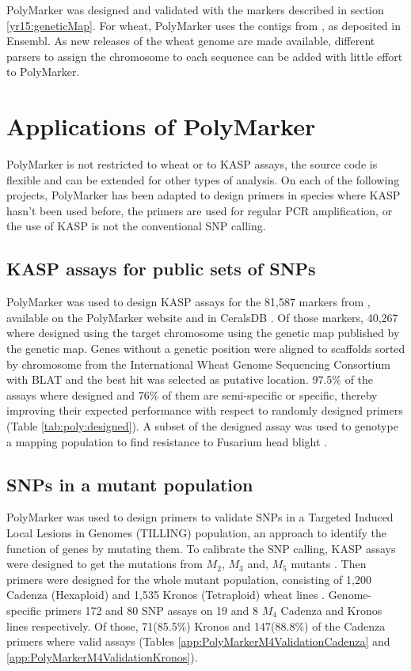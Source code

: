 PolyMarker was designed and validated with the markers described in section \ref{yr15:geneticMap}. 
For wheat, PolyMarker uses the contigs from \cite{Mayer2014}, as deposited in Ensembl. 
As new releases of the wheat genome are made available, different parsers to assign the chromosome to each sequence can be added with little effort to PolyMarker. 




\section{Applications of PolyMarker}

PolyMarker is not restricted to wheat or to KASP assays, the source code is flexible and can be extended for other types of analysis. 
On each of the following projects, PolyMarker has been adapted to design primers in species where KASP hasn't been used before, the primers are used for regular PCR amplification, or the use of KASP is not the conventional SNP calling. 

\subsection{KASP assays for public sets of SNPs} 

PolyMarker was used to design KASP assays for the 81,587 markers from \citep{Wang2014}, available on the PolyMarker website and in CeralsDB \citep{Wilkinson2012}. 
Of those markers, 40,267 where designed using the target chromosome using the genetic map published by the genetic map. 
Genes without a genetic position were aligned to scaffolds sorted by chromosome from the International Wheat Genome Sequencing Consortium \citep{Mayer2014} with BLAT \citep{Kent2002} and the best hit was selected as putative location. 
97.5\% of the assays where designed and 76\% of them are semi-specific or specific, thereby improving their expected performance with respect to randomly designed primers (Table \ref{tab:poly:designed}). 
A subset of the designed assay was used to genotype a mapping population to find resistance to Fusarium head blight \citep{Burt2015}. 

\subsection{SNPs in a mutant population}

PolyMarker was used to design primers to validate SNPs in a Targeted Induced Local Lesions in Genomes (TILLING) population, an approach to identify the function of genes by mutating them. 
To calibrate the SNP calling, KASP assays were designed to get the mutations from $M_{2}$, $M_{3}$ and, $M_{5}$ mutants \citep{King2015}. 
Then primers were designed for the whole mutant population, consisting of 1,200 Cadenza (Hexaploid) and 1,535 Kronos (Tetraploid) wheat lines \citep{Krasileva2016}. Genome-specific primers  172 and 80 SNP assays on 19 and 8 $M_{4}$ Cadenza and Kronos lines respectively. 
Of those, 71(85.5\%) Kronos and 147(88.8\%) of the Cadenza primers where valid assays (Tables \ref{app:PolyMarkerM4ValidationCadenza} and \ref{app:PolyMarkerM4ValidationKronos}).  

